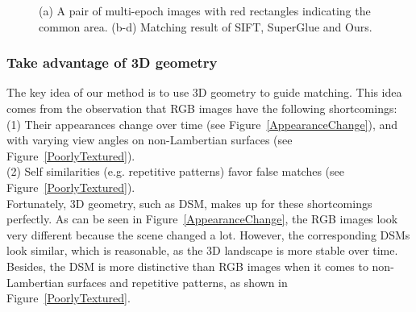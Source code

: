 \begin{figure}[htbp]
\begin{center}
{\begin{minipage}[t]{0.45\linewidth}
	\end{minipage}%
}
		\caption{(a) A pair of multi-epoch images with red rectangles indicating the common area. (b-d) Matching result of SIFT, SuperGlue and Ours.}
		\label{MultiEpochImgPair}
	\end{center}
\end{figure}

\subsubsection{Take advantage of 3D geometry}
The key idea of our method is to use 3D geometry to guide matching. This idea comes from the observation that RGB images have the following shortcomings:\\
(1) Their appearances change over time (see Figure~\ref{AppearanceChange}), and with varying view angles on non-Lambertian surfaces (see Figure~\ref{PoorlyTextured}).\\
(2) Self similarities (e.g. repetitive patterns) favor false matches (see Figure~\ref{PoorlyTextured}).\\
Fortunately, 3D geometry, such as DSM, makes up for these shortcomings perfectly. As can be seen in Figure~\ref{AppearanceChange}, the RGB images look very different because the scene changed a lot. However, the corresponding DSMs look similar, which is reasonable, as the 3D landscape is more stable over time. Besides, the DSM is more distinctive than RGB images when it comes to non-Lambertian surfaces and repetitive patterns, as shown in Figure~\ref{PoorlyTextured}. 


